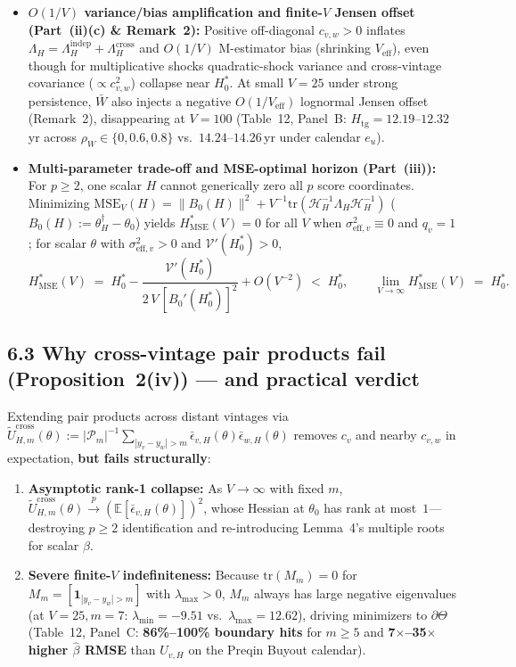 \documentclass[10.5pt]{article}
\newcommand{\E}{\mathbb{E}}
\begin{document}
\begin{itemize}
  \item \textbf{$O(1/V)$ variance/bias amplification and finite-$V$ Jensen offset (Part~(ii)(c) \& Remark~2):} Positive off-diagonal $c_{v,w}>0$ inflates $\Lambda_H = \Lambda_H^{\mathrm{indep}} + \Lambda_H^{\mathrm{cross}}$ and $O(1/V)$ M-estimator bias (shrinking $V_{\mathrm{eff}}$), even though for multiplicative shocks quadratic-shock variance and cross-vintage covariance ($\propto c_{v,w}^2$) collapse near $H_0^\ast$. At small $V=25$ under strong persistence, $\bar W$ also injects a negative $O(1/V_{\mathrm{eff}})$ lognormal Jensen offset (Remark~2), disappearing at $V=100$ (Table~12, Panel~B: $H_{\mathrm{tg}} = 12.19\text{--}12.32$\,yr across $\rho_W\in\{0,0.6,0.8\}$ vs.\ $14.24\text{--}14.26$\,yr under calendar $e_u$).
  \item \textbf{Multi-parameter trade-off and MSE-optimal horizon (Part~(iii)):} For $p\ge 2$, one scalar $H$ cannot generically zero all $p$ score coordinates. Minimizing $\mathrm{MSE}_V(H) = \|B_0(H)\|^2 + V^{-1}\mathrm{tr}(\mathcal{H}_H^{-1}\Lambda_H\mathcal{H}_H^{-1})$ ($B_0(H):=\theta_H^\dagger - \theta_0$) yields $H_{\mathrm{MSE}}^\ast(V) = 0$ for all $V$ when $\sigma_{\mathrm{eff},v}^2 \equiv 0$ and $q_v=1$; for scalar $\theta$ with $\sigma_{\mathrm{eff},v}^2>0$ and $\mathcal{V}'(H_0^\ast)>0$,
  \[
  H_{\mathrm{MSE}}^\ast(V) \;=\; H_0^\ast - \frac{\mathcal{V}'(H_0^\ast)}{2\,V\,[B_0'(H_0^\ast)]^2} + O(V^{-2}) \;<\; H_0^\ast,
  \qquad \lim_{V\to\infty} H_{\mathrm{MSE}}^\ast(V) \;=\; H_0^\ast.
  \]
\end{itemize}

\subsection*{6.3 Why cross-vintage pair products fail (Proposition~2(iv)) — and practical verdict}

Extending pair products across distant vintages via $\widetilde{U}_{H,m}^{\mathrm{cross}}(\theta) := |\mathcal{P}_m|^{-1}\!\sum_{|y_v-y_w|>m}\!\bar\epsilon_{v,H}(\theta)\bar\epsilon_{w,H}(\theta)$ removes $c_v$ and nearby $c_{v,w}$ in expectation, \textbf{but fails structurally}:
\begin{enumerate}
  \item \textbf{Asymptotic rank-1 collapse:} As $V\to\infty$ with fixed $m$, $\widetilde{U}_{H,m}^{\mathrm{cross}}(\theta) \xrightarrow{p} (\E[\bar\epsilon_{v,H}(\theta)])^2$, whose Hessian at $\theta_0$ has rank at most~$1$---destroying $p\ge 2$ identification and re-introducing Lemma~4's multiple roots for scalar $\beta$.
  \item \textbf{Severe finite-$V$ indefiniteness:} Because $\mathrm{tr}(M_m)=0$ for $M_m=[\mathbf{1}_{|y_v-y_w|>m}]$ with $\lambda_{\max}>0$, $M_m$ always has large negative eigenvalues (at $V=25, m=7$: $\lambda_{\min}=-9.51$ vs.\ $\lambda_{\max}=12.62$), driving minimizers to $\partial\Theta$ (Table~12, Panel~C: \textbf{86\%--100\% boundary hits} for $m\ge 5$ and \textbf{7$\times$--35$\times$ higher $\hat\beta$ RMSE} than $U_{v,H}$ on the Preqin Buyout calendar).
\end{enumerate}
\end{document}
